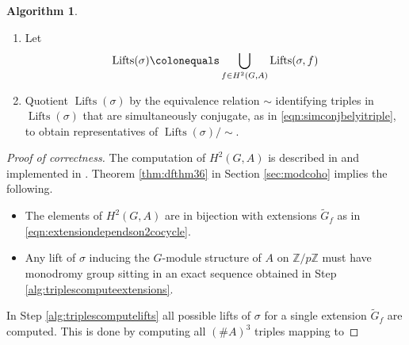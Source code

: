 \documentclass{dcthesis}
\newcommand{\ZZ}{\mathbb Z}
\newcommand{\mm}[1]{{\color{blue} \sf MM: [#1]}}
\newcommand{\wt}[1]{\widetilde{#1}}
\DeclareMathOperator{\Lifts}{Lifts}
\numberwithin{equation}{section}
\theoremstyle{definition}
\newtheorem{alg}[equation]{Algorithm}
\theoremstyle{remark}
\begin{document}
{{{\begin{alg}
\begin{enumerate}
        \item
          \label{alg:triplesunionoflifts}
          Let
          \begin{equation}
            \label{eqn:unionoflifts}
            \Lifts(\sigma)
            \colonequals
            \bigcup_{f\in H^2(G,A)}
            \Lifts(\sigma, f)
          \end{equation}
        \item
          \label{alg:triplesuptoisomorphism}
          Quotient $\Lifts(\sigma)$
          by the equivalence relation
          $\sim$ identifying triples
          in $\Lifts(\sigma)$ that
          are simultaneously conjugate,
          as in \eqref{eqn:simconjbelyitriple},
          to obtain representatives of
          $\Lifts(\sigma)/\!\!\sim$.
      \end{enumerate}
    \end{alg}
    \begin{proof}[Proof of correctness]
      The computation of $H^2(G,A)$ is described
      in \cite{magmabook} and implemented in
      \cite{magma}.
      Theorem \ref{thm:dfthm36}
      in Section \ref{sec:modcoho} implies
      the following.
      \begin{itemize}
        \item
          The elements of $H^2(G,A)$
          are in bijection
          with extensions
          $\wt{G}_f$
          as in
          \eqref{eqn:extensiondependson2cocycle}.
        \item
          Any lift of $\sigma$
          inducing the $G$-module
          structure of $A$ on $\ZZ/p\ZZ$
          must have monodromy group sitting
          in an exact sequence obtained in
          Step \ref{alg:triplescomputeextensions}.
      \end{itemize}
      In Step \ref{alg:triplescomputelifts}
      all possible lifts of $\sigma$
      for a single extension $\wt{G}_f$
      are computed.
      This is done by computing
      all $(\#A)^3$
      triples mapping to

\end{proof}}}}
\end{document}
